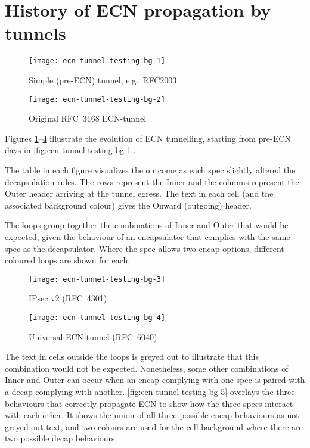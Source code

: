 \section{History of ECN propagation by tunnels}\label{ecn-encap-test_History}

\begin{figure}[h]
	\centering
	\texttt{[image: ecn-tunnel-testing-bg-1]}
	\caption{Simple (pre-ECN) tunnel, e.g.\ RFC2003}\label{fig:ecn-tunnel-testing-bg-1}
\end{figure}
\begin{figure}[h]
	\centering
	\texttt{[image: ecn-tunnel-testing-bg-2]}
	\caption{Original RFC~3168 ECN-tunnel~\cite{rfc3168}}\label{fig:ecn-tunnel-testing-bg-2}
\end{figure}

Figures \ref{fig:ecn-tunnel-testing-bg-1}--\ref{fig:ecn-tunnel-testing-bg-4} illustrate the evolution of ECN tunnelling, starting from pre-ECN days in \autoref{fig:ecn-tunnel-testing-bg-1}.

The table in each figure visualizes the outcome as each spec slightly altered the decapsulation rules. The rows represent the Inner and the columns represent the Outer header arriving at the tunnel egress. The text in each cell (and the associated background colour) gives the Onward (outgoing) header. 

The loops group together the combinations of Inner and Outer that would be expected, given the behaviour of an encapsulator that complies with the same spec as the decapsulator. Where the spec allows two encap options, different coloured loops are shown for each.

\newpage
\begin{figure}[h]
	\centering
	\texttt{[image: ecn-tunnel-testing-bg-3]}
	\caption{IPsec v2 (RFC~4301)~\cite{IETF_RFC4301:IPSEC_architecture}}\label{fig:ecn-tunnel-testing-bg-3}
\end{figure}
\begin{figure}[h]
	\centering
	\texttt{[image: ecn-tunnel-testing-bg-4]}
	\caption{Universal ECN tunnel (RFC~6040)~\cite{Briscoe07b:ECN-tunnel}}\label{fig:ecn-tunnel-testing-bg-4}
\end{figure}

The text in cells outside the loops is greyed out to illustrate that this combination would not be expected. Nonetheless, some other combinations of Inner and Outer can occur when an encap complying with one spec is paired with a decap complying with another. \autoref{fig:ecn-tunnel-testing-bg-5} overlays the three behaviours that correctly propagate ECN to show how the three specs interact with each other. It shows the union of all three possible encap behaviours as not greyed out text, and two colours are used for the cell background where there are two possible decap behaviours.

